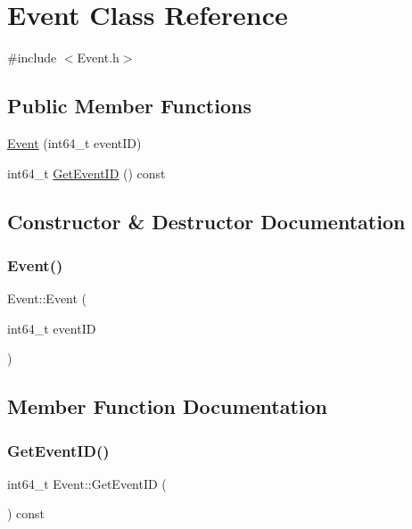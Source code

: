 \hypertarget{class_event}{}\section{Event Class Reference}
\label{class_event}


{\ttfamily \#include $<$Event.\+h$>$}

\subsection*{Public Member Functions}
\begin{DoxyCompactItemize}
\item 
\mbox{\hyperlink{class_event_ab7d875af219d0d97a3b1173b576bf65a}{Event}} (int64\+\_\+t event\+ID)
\item 
int64\+\_\+t \mbox{\hyperlink{class_event_a49eec72ca49bb73e1d28a09db8babadd}{Get\+Event\+ID}} () const
\end{DoxyCompactItemize}


\subsection{Constructor \& Destructor Documentation}
\mbox{\label{class_event_ab7d875af219d0d97a3b1173b576bf65a}} 
\subsubsection{\texorpdfstring{Event()}{Event()}}
{\footnotesize\ttfamily Event\+::\+Event (\begin{DoxyParamCaption}\item[{int64\+\_\+t}]{event\+ID }\end{DoxyParamCaption})}



\subsection{Member Function Documentation}
\mbox{\label{class_event_a49eec72ca49bb73e1d28a09db8babadd}} 
\subsubsection{\texorpdfstring{Get\+Event\+I\+D()}{GetEventID()}}
{\footnotesize\ttfamily int64\+\_\+t Event\+::\+Get\+Event\+ID (\begin{DoxyParamCaption}{ }\end{DoxyParamCaption}) const\hspace{0.3cm}{\ttfamily [inline]}}



